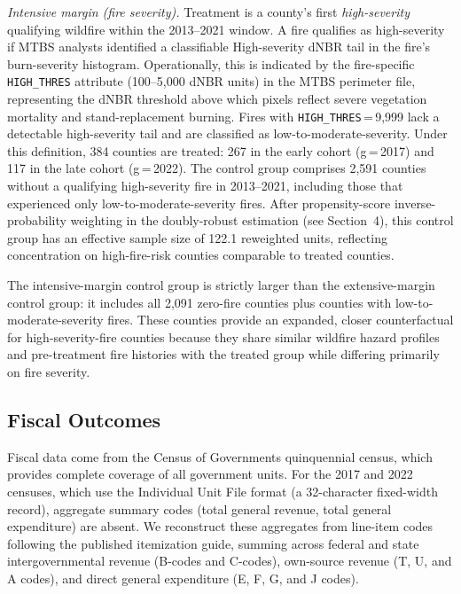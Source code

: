 \documentclass[12pt]{article}
\begin{document}
\textit{Intensive margin (fire severity).} Treatment is a county's first
\textit{high-severity} qualifying wildfire within the 2013--2021 window. A fire
qualifies as high-severity if MTBS analysts identified a classifiable High-severity
dNBR tail in the fire's burn-severity histogram. Operationally, this is indicated by
the fire-specific \texttt{HIGH\_THRES} attribute (100--5,000 dNBR units) in the MTBS
perimeter file, representing the dNBR threshold above which pixels reflect severe
vegetation mortality and stand-replacement burning. Fires with
\texttt{HIGH\_THRES}\,=\,9,999 lack a detectable high-severity tail and are
classified as low-to-moderate-severity. Under this definition, 384 counties are
treated: 267 in the early cohort (g\,=\,2017) and 117 in the late cohort (g\,=\,2022).
The control group comprises 2,591 counties without a qualifying high-severity fire
in 2013--2021, including those that experienced only low-to-moderate-severity fires.
After propensity-score inverse-probability weighting in the doubly-robust estimation
(see Section~4), this control group has an effective sample size of 122.1 reweighted
units, reflecting concentration on high-fire-risk counties comparable to treated
counties.

The intensive-margin control group is strictly larger than the extensive-margin
control group: it includes all 2,091 zero-fire counties plus counties with
low-to-moderate-severity fires. These counties provide an expanded, closer
counterfactual for high-severity-fire counties because they share similar wildfire
hazard profiles and pre-treatment fire histories with the treated group while
differing primarily on fire severity.

\subsection{Fiscal Outcomes}

Fiscal data come from the Census of Governments quinquennial census, which provides
complete coverage of all government units. For the 2017 and 2022 censuses, which
use the Individual Unit File format (a 32-character fixed-width record), aggregate
summary codes (total general revenue, total general expenditure) are absent.
We reconstruct these aggregates from line-item codes following the published
itemization guide, summing across federal and state intergovernmental revenue
(B-codes and C-codes), own-source revenue (T, U, and A codes), and direct general
expenditure (E, F, G, and J codes).
\end{document}
